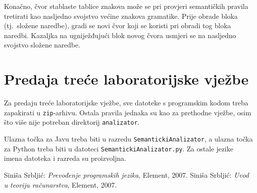 \documentclass[times, 12pt, utf8]{book}
\begin{document}
Konačno, čvor stablaste tablice znakova može se pri provjeri semantičkih pravila tretirati kao nasljedno svojstvo većine znakova gramatike.
Prije obrade bloka (tj.~složene naredbe), gradi se novi čvor koji se koristi pri obradi tog bloka naredbi.
Kazaljka na ugniježđujući blok novog čvora usmjeri se na nasljedno svojstvo složene naredbe.


\section{Predaja treće laboratorijske vježbe}
Za predaju treće laboratorijske vježbe, sve datoteke s programskim kodom treba zapakirati u \verb|zip|-arhivu.
Ostala pravila jednaka su kao za prethodne vježbe, osim što više nije potreban direktorij \verb|analizator|.

Ulazna točka za Javu treba biti u razredu \verb|SemantickiAnalizator|, a ulazna točka za Python treba biti u datoteci \verb|SemantickiAnalizator.py|.
Za ostale jezike imena datoteka i razreda su proizvoljna.

\newpage
{}
\begin{thebibliography}{10}
Siniša Srbljić:
\emph{Prevođenje programskih jezika}, Element, 2007.
Siniša Srbljić:
\emph{Uvod u teoriju računarstva}, Element, 2007.
\end{thebibliography}
\end{document}
